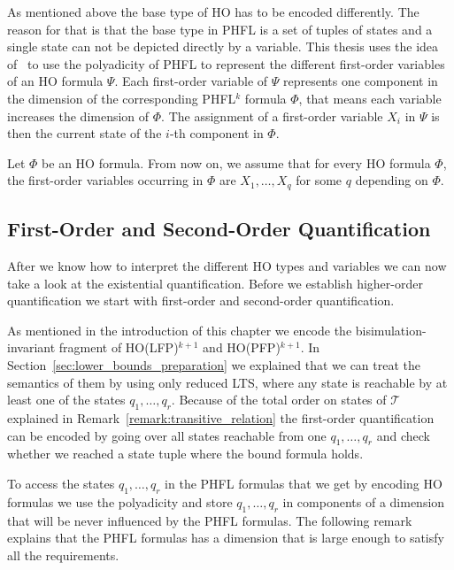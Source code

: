 As mentioned above the base type of HO has to be encoded differently. The reason for that is that the base type in PHFL is a
set of tuples of states and a single state can not be depicted directly by a variable. This thesis uses the
idea of~\cite{lange2014capturing} to use the polyadicity of PHFL to represent the different first-order variables of an HO formula
$\Psi$. Each first-order variable of $\Psi$ represents one component in the dimension of the 
corresponding PHFL$^k$ formula $\Phi$, that
means each variable increases the dimension of $\Phi$. The assignment of a first-order 
variable $X_i$ in $\Psi$ is then the current state of the $i$-th component in $\Phi$.

Let $\Phi$ be an HO formula. From now on, we assume that for every HO formula $\Phi$, the first-order variables occurring in $\Phi$ are 
$X_1, \dots, X_q$ for some $q$ depending on $\Phi$.

\subsection{First-Order and Second-Order Quantification}\label{subsec:existentialQuantifiers}

After we know how to interpret the different HO types and variables we can now take a look at the existential quantification. Before we establish higher-order quantification we start with first-order and second-order quantification.

As mentioned in the introduction of this chapter we encode the bisimula\-tion-invariant fragment of HO(LFP)$^{k + 1}$ and HO(PFP)$^{k+1}$. In Section~\ref{sec:lower_bounds_preparation}  we explained that we can treat the semantics of them by using only reduced LTS, where any state is reachable by at least one of the states $q_1, \dots, q_r$. Because of the total order on states of $\mathcal{T}$ explained in Remark~\ref{remark:transitive_relation} the first-order
quantification can be encoded by going over all states reachable from one $q_1, \dots, q_r$ and check whether we
reached a state tuple where the bound formula holds.

To access the states $q_1, \dots, q_r$ in the PHFL formulas that we get by encoding HO 
formulas we use the polyadicity and store $q_1, \dots, q_r$ in components of a dimension that 
will be never influenced by the PHFL formulas. The following remark explains that the PHFL 
formulas has a dimension that is large enough to satisfy all the requirements. 

